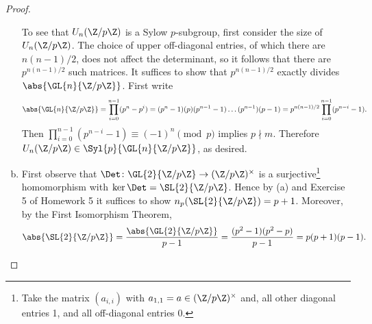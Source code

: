 \documentclass[10pt]{amsart}
\begin{document}
\begin{thm}
\begin{proof}
\begin{enumerate}[(a)]
      To see that $U_n(\Z/p\Z)$ is a Sylow $p$-subgroup, first consider the size of $U_n(\Z/p\Z)$.
      The choice of upper off-diagonal entries, of which there are $n(n-1)/2$, does not affect the determinant, so it follows that there are $p^{n(n-1)/2}$ such matrices.
      It suffices to show that $p^{n(n-1)/2}$ exactly divides $\abs{\GL{n}{\Z/p\Z}}$.
      First write 
      $$\abs{\GL{n}{\Z/p\Z}} = \prod_{i=0}^{n-1} (p^n - p^i) = (p^n - 1)(p)(p^{n-1} - 1) \ldots (p^{n-1})(p - 1) = p^{n(n-1)/2}\prod_{i=0}^{n-1}(p^{n-i} - 1).$$
      Then  $\prod_{i=0}^{n-1}(p^{n-i} - 1)  \equiv (-1)^n \pmod{p}$ implies $p \nmid m$.
      Therefore $U_n(\Z/p\Z) \in \Syl{p}{\GL{n}{\Z/p\Z}}$, as desired.
    \item
      First observe that $\Det \colon \GL{2}{\Z/p\Z} \rightarrow (\Z/p\Z)^\times$ is a surjective\footnote[1]{Take the matrix $(a_{i,i})$ with $a_{1,1} = a \in (\Z/p\Z)^\times$ and, all other diagonal entries 1, and all off-diagonal entries 0.} homomorphism  with $\ker\Det = \SL{2}{\Z/p\Z}$.
      Hence by (a) and Exercise 5 of Homework 5 it suffices to show $n_p(\SL{2}{\Z/p\Z}) = p + 1$.
      Moreover, by the First Isomorphism Theorem,
      $$\abs{\SL{2}{\Z/p\Z}} = \frac{\abs{\GL{2}{\Z/p\Z}}}{p-1} = \frac{(p^2 - 1)(p^2 - p)}{p-1} = p(p+1)(p-1).$$
        

\end{enumerate}
\end{proof}
\end{thm}
\end{document}
